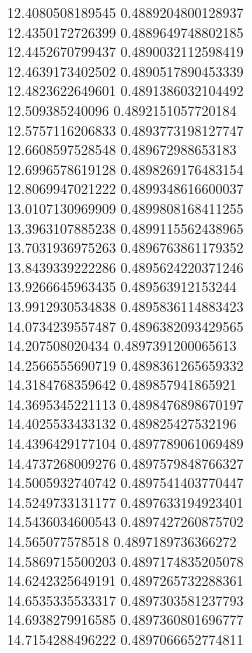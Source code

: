 {12.4080508189545 0.4889204800128937
 \\
12.4350172726399 0.4889649748802185
 \\
12.4452670799437 0.4890032112598419
 \\
12.4639173402502 0.4890517890453339
 \\
12.4823622649601 0.4891386032104492
 \\
12.509385240096 0.4892151057720184
 \\
12.5757116206833 0.4893773198127747
 \\
12.6608597528548 0.489672988653183
 \\
12.6996578619128 0.4898269176483154
 \\
12.8069947021222 0.4899348616600037
 \\
13.0107130969909 0.4899808168411255
 \\
13.3963107885238 0.4899115562438965
 \\
13.7031936975263 0.4896763861179352
 \\
13.8439339222286 0.4895624220371246
 \\
13.9266645963435 0.489563912153244
 \\
13.9912930534838 0.4895836114883423
 \\
14.0734239557487 0.4896382093429565
 \\
14.207508020434 0.4897391200065613
 \\
14.2566555690719 0.4898361265659332
 \\
14.3184768359642 0.489857941865921
 \\
14.3695345221113 0.4898476898670197
 \\
14.4025533433132 0.489825427532196
 \\
14.4396429177104 0.4897789061069489
 \\
14.4737268009276 0.4897579848766327
 \\
14.5005932740742 0.4897541403770447
 \\
14.5249733131177 0.4897633194923401
 \\
14.5436034600543 0.4897427260875702
 \\
14.565077578518 0.4897189736366272
 \\
14.5869715500203 0.4897174835205078
 \\
14.6242325649191 0.4897265732288361
 \\
14.6535335533317 0.4897303581237793
 \\
14.6938279916585 0.4897360801696777
 \\
14.7154288496222 0.4897066652774811
 \\
}
